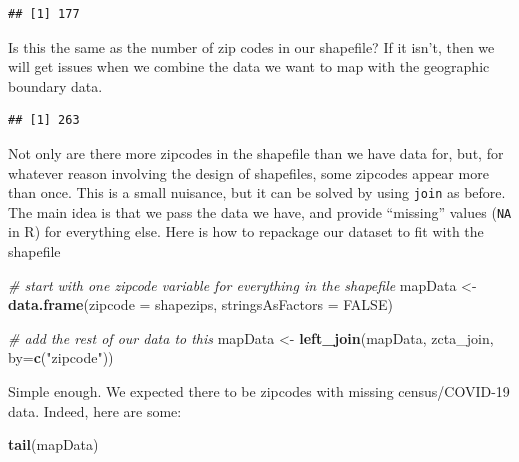 \documentclass[openany]{book}
\newenvironment{Shaded}{\begin{snugshade}}{\end{snugshade}}
\newcommand{\CommentTok}[1]{\textcolor[rgb]{0.56,0.35,0.01}{\textit{#1}}}
\newcommand{\DataTypeTok}[1]{\textcolor[rgb]{0.13,0.29,0.53}{#1}}
\newcommand{\KeywordTok}[1]{\textcolor[rgb]{0.13,0.29,0.53}{\textbf{#1}}}
\newcommand{\NormalTok}[1]{#1}
\newcommand{\OperatorTok}[1]{\textcolor[rgb]{0.81,0.36,0.00}{\textbf{#1}}}
\newcommand{\OtherTok}[1]{\textcolor[rgb]{0.56,0.35,0.01}{#1}}
\newcommand{\StringTok}[1]{\textcolor[rgb]{0.31,0.60,0.02}{#1}}
\begin{document}
\begin{verbatim}
## [1] 177
\end{verbatim}

Is this the same as the number of zip codes in our shapefile? If it isn't, then we will get issues when we combine the data we want to map with the geographic boundary data.

\begin{Shaded}
\end{Shaded}

\begin{verbatim}
## [1] 263
\end{verbatim}

Not only are there more zipcodes in the shapefile than we have data for, but, for whatever reason involving the design of shapefiles, some zipcodes appear more than once. This is a small nuisance, but it can be solved by using \texttt{join} as before. The main idea is that we pass the data we have, and provide ``missing'' values (\texttt{NA} in R) for everything else.
Here is how to repackage our dataset to fit with the shapefile

\begin{Shaded}
\begin{Highlighting}[]
\CommentTok{# start with one zipcode variable for everything in the shapefile}
\NormalTok{mapData <-}\StringTok{ }\KeywordTok{data.frame}\NormalTok{(}\DataTypeTok{zipcode =}\NormalTok{ shapezips, }\DataTypeTok{stringsAsFactors =} \OtherTok{FALSE}\NormalTok{)}

\CommentTok{# add the rest of our data to this}
\NormalTok{mapData <-}\StringTok{ }\KeywordTok{left_join}\NormalTok{(mapData, zcta_join, }\DataTypeTok{by=}\KeywordTok{c}\NormalTok{(}\StringTok{"zipcode"}\NormalTok{))}
\end{Highlighting}
\end{Shaded}

Simple enough. We expected there to be zipcodes with missing census/COVID-19 data. Indeed, here are some:

\begin{Shaded}
\begin{Highlighting}[]
\KeywordTok{tail}\NormalTok{(mapData)}
\end{Highlighting}
\end{Shaded}
\end{document}

